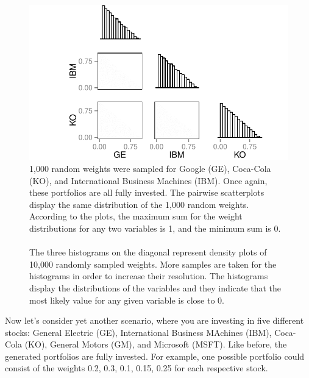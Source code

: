 \documentclass{article}\usepackage{graphicx, color}
\makeatletter
\def\maxwidth{ %
  \ifdim\Gin@nat@width>\linewidth
    \linewidth
  \else
    \Gin@nat@width
  \fi
}
\newenvironment{knitrout}{}{} %
\makeatother
\begin{document}
\begin{figure}[H]
\begin{knitrout}
\color{fgcolor}
\includegraphics[width=\maxwidth]{figure/figChunk1} 

\end{knitrout}

\caption{1,000 random weights were sampled for Google (GE), Coca-Cola (KO), and International Business Machines (IBM). Once again, these portfolios are all fully invested. The pairwise scatterplots display the same distribution of the 1,000 random weights. According to the plots, the maximum sum for the weight distributions for any two variables is 1, and the minimum sum is 0.
\\
\\
The three histograms on the diagonal represent density plots of 10,000 randomly sampled weights. More samples are taken for the histograms in order to increase their resolution. The histograms display the distributions of the variables and they indicate that the most likely value for any given variable is close to 0.}

\end{figure}

Now let's consider yet another scenario, where you are investing in five different stocks: General Electric (GE), International Business MAchines (IBM), Coca-Cola (KO), General Motors (GM), and Microsoft (MSFT). Like before, the generated portfolios are fully invested. For example, one possible portfolio could consist of the weights 0.2, 0.3, 0.1, 0.15, 0.25 for each respective stock.
\end{document}
